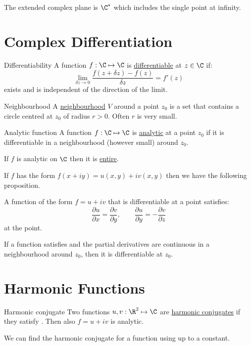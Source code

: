\documentclass[../Main.tex]{subfiles}
\begin{document}
The extended complex plane is $\C^*$ which includes the single point at infinity.
\section{Complex Differentiation}
\begin{definition}{Differentiability}
    A function $f : \C \mapsto \C$ is \underline{differentiable} at $z \in \C$ if:
    \begin{equation*}
        \lim_{\delta z \to 0} \frac{f(z + \delta z) - f(z)}{\delta z} = f'(z)
    \end{equation*}
    exists and is independent of the direction of the limit.
\end{definition}
\begin{definition}{Neighbourhood}
    A \underline{neighbourhood} $V$ around a point $z_0$ is a set that contains a circle centred at $z_0$ of radius $r > 0$. Often $r$ is very small.
\end{definition}
\begin{definition}{Analytic function}
    A function $f : \C \mapsto \C$ is \underline{analytic} at a point $z_0$ if it is differentiable in a neighbourhood (however small) around $z_0$.
\end{definition}
If $f$ is analytic on $\C$ then it is \underline{entire}.

If $f$ has the form $f(x + i y) = u(x, y) + i v(x, y)$ then we have the following proposition.
\begin{proposition}
    A function of the form $f = u + i v$ that is differentiable at a point satisfies:
    \begin{equation}
        \frac{\partial u}{\partial x} = \frac{\partial v}{\partial y},\qquad \frac{\partial u}{\partial y} = - \frac{\partial v}{\partial z}
        \label{eqnCauchyRiemann}
    \end{equation}
    at the point.

    If a function satisfies  and the partial derivatives are continuous in a neighbourhood around $z_0$, then it is differentiable at $z_0$.
    \label{propCauchyRiemann}
\end{proposition}
\section{Harmonic Functions}
\begin{definition}{Harmonic conjugate}
    Two functions $u, v : \R^2 \mapsto \C$ are \underline{harmonic conjugates} if they satisfy . Then also $f = u + i v$ is analytic.
\end{definition}
We can find the harmonic conjugate for a function using  up to a constant.
\end{document}
